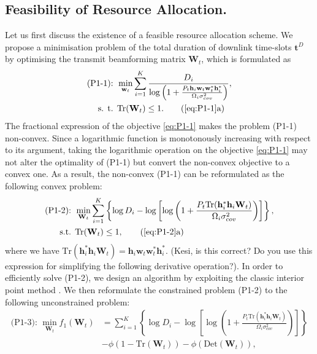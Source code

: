 \documentclass[12pt,draft,onecolumn,journal]{IEEEtran}
\begin{document}
\subsection{Feasibility of Resource Allocation.}

Let us first discuss the existence of a feasible resource allocation scheme. We propose a minimisation problem of the total duration of downlink time-slots $\mathbf{t}^D$ by optimising the transmit beamforming matrix $\mathbf{W}_t$, which is formulated as
\begin{align}
	\text{(P1-1): } &\min_{\mathbf{w}_t}\sum_{i=1}^{K} \frac{D_i}{\log\left(1 + \frac{P_t\mathbf{h}_i\mathbf{w}_t\mathbf{w}_t^*\mathbf{h}_i^*}{\Omega_i\sigma_{cov}^2}\right)}, \label{eq:P1-1}\\
	\text{s. t. } &\text{Tr}(\mathbf{W}_t) \leq 1. \tag{\ref{eq:P1-1}a} \label{eq:P1-1-a}
\end{align}
The fractional expression of the objective \eqref{eq:P1-1} makes the problem (P1-1) non-convex. Since a logarithmic function is monotonously increasing with respect to its argument, taking the logarithmic operation on the objective \eqref{eq:P1-1} may not alter the optimality of (P1-1) but convert the non-convex objective to a convex one. As a result, the non-convex (P1-1) can be reformulated as the following convex problem:
\begin{align}
	\text{(P1-2): } & \min_{\mathbf{W}_t}\sum_{i=1}^{K} \left\{ \log D_i - \log\left[\log\left(1 + \frac{P_t\text{Tr} (\mathbf{h}_i^*\mathbf{h}_i\mathbf{W}_t)}{\Omega_i\sigma_{cov}^2}\right)\right]\right\}, \label{eq:P1-2}\\
	\text{s.t. } & \text{Tr}(\mathbf{W}_t) \leq 1, \tag{\ref{eq:P1-2}a} \label{eq:P1-2-a}
\end{align}
where we have $\text{Tr}(\mathbf{h}_i^*\mathbf{h}_i\mathbf{W}_t) = \mathbf{h}_i\mathbf{w}_t\mathbf{w}_t^*\mathbf{h}_i^*$. {\color{red} (Kesi, is this correct? Do you use this expression for simplifying the following derivative operation?)}. In order to efficiently solve (P1-2), we design an algorithm by exploiting the classic interior point method \cite{convex}. We then reformulate the constrained problem (P1-2) to the following unconstrained problem:
\begin{align}
	\text{(P1-3): } \min_{\mathbf{W}_t} f_1(\mathbf{W}_t) &= \sum_{i=1}^{K} \left\{ \log D_i - \log\left[\log\left(1 + \frac{P_t\text{Tr}(\mathbf{h}_i^*\mathbf{h}_i\mathbf{W}_t)}{\Omega_i\sigma_{cov}^2}\right)\right]\right\} \nonumber \\
	&- \phi(1-\text{Tr}(\mathbf{W}_t)) - \phi(\text{Det}(\mathbf{W}_t)), \label{eq:P1-3}
\end{align}
\end{document}
